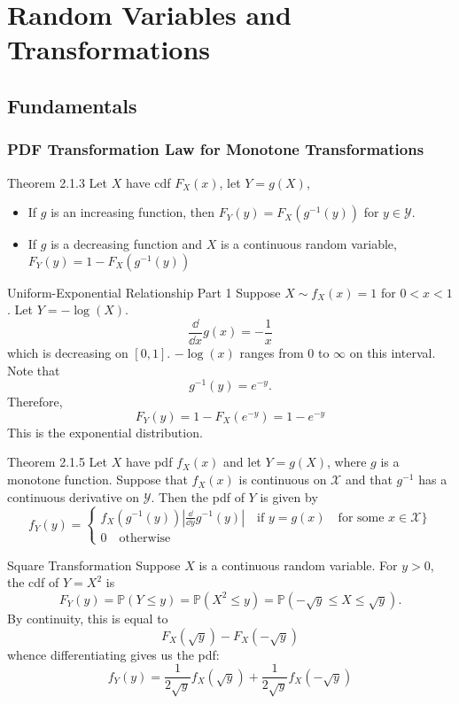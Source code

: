 \documentclass[../main]{subfiles}
\begin{document}
\chapter{Random Variables and Transformations}
\section{Fundamentals}
\subsection{PDF Transformation Law for Monotone Transformations}

\begin{bbox}{Theorem 2.1.3}
    Let $X$ have cdf $F_X(x)$, let $Y = g(X)$,
    \begin{itemize}
        \item If $g$ is an increasing function, then $F_Y(y) = F_X(g^{-1}(y))$ for $y\in\mathcal Y$.
        \item If $g$ is a decreasing function and $X$ is a continuous random variable, $F_Y(y) = 1-F_X(g^{-1}(y))$
    \end{itemize}
\end{bbox}
\begin{pbox}{Uniform-Exponential Relationship Part 1}
    Suppose $X\sim f_X(x) = 1$ for $0<x<1$. Let $Y=-\log(X)$.
    \[
    \frac{\dd}{\dd x}g(x) = -\frac{1}{x}
    \]
    which is decreasing on $[0,1]$. $-\log(x)$ ranges from $0$ to $\infty$ on this interval. Note that 
    \[
    g^{-1}(y) = e^{-y}.
    \]
    Therefore, 
    \[
    F_Y(y) = 1- F_X(e^{-y}) = 1-e^{-y}
    \]
    This is the exponential distribution.
\end{pbox}
\begin{bbox}{Theorem 2.1.5}
    Let $X$ have pdf $f_X(x)$ and let $Y=g(X)$, where $g$ is a monotone function. Suppose that $f_X(x)$ is continuous on $\mathcal X$ and that $g^{-1}$ has a continuous derivative on $\mathcal Y$. Then the pdf of $Y$ is given by 
    \[
    f_Y(y) = \begin{cases}
        f_X(g^{-1}(y))|\frac{\dd}{\dd y}g^{-1}(y)|\quad \text{if $y=g(x) \quad \text{for some $x\in \mathcal X$}\}$}\\
        0 \quad \text{otherwise}
    \end{cases}
    \]
\end{bbox}
\begin{pbox}{Square Transformation}
    Suppose $X$ is a continuous random variable. For $y>0$, the cdf of $Y=X^2$ is 
    \[
    F_Y(y) = \mathbb P(Y\le y) = \mathbb P(X^2 \le y) = \mathbb P(-\sqrt{y}\le X \le \sqrt{y}).
    \]
    By continuity, this is equal to 
    \[
    F_X(\sqrt{y}) - F_X(-\sqrt{y})
    \]
    whence differentiating gives us the pdf:
    \[
    f_Y(y) = \frac{1}{2\sqrt{y}}f_X(\sqrt{y})+\frac{1}{2\sqrt{y}}f_X(-\sqrt{y})
    \]
\end{pbox}
\end{document}
